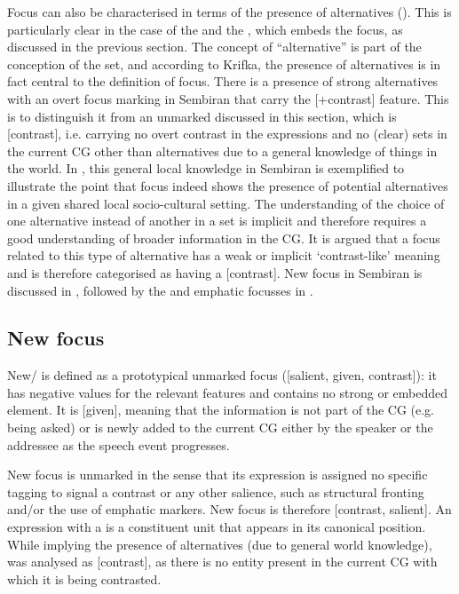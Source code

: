 \documentclass[output=paper
,modfonts
,nonflat]{langsci/langscibook}
\begin{document}
Focus can also be characterised in terms of the presence of alternatives (\citealt{Krifka2008,Krifka2012}). This is particularly clear in the case of the  and the , which embeds the focus, as discussed in the previous section. The concept of “alternative” is part of the conception of the set, and according to Krifka, the presence of alternatives is in fact central to the definition of focus. There is a presence of strong alternatives with an overt focus marking in Sembiran  that carry the [+contrast] feature. This is to distinguish it from an unmarked  discussed in this section, which is [\textminus contrast], i.e. carrying no overt contrast in the expressions and no (clear)  sets in the current CG other than alternatives due to a general knowledge of things in the world. In , this general local knowledge in Sembiran  is exemplified to illustrate the point that focus indeed shows the presence of potential alternatives in a given shared local socio-cultural setting. The understanding of the choice of one alternative instead of another in a set is implicit and therefore requires a good understanding of broader information in the CG. It is argued that a focus related to this type of alternative has a weak or implicit ‘contrast-like’ meaning and is therefore categorised as having a [\textminus contrast]. New focus in Sembiran  is discussed in , followed by the  and emphatic focusses in . 

\subsection{\label{arka:s4.1}New focus}

New/ is defined as a prototypical unmarked focus ([\textminus salient, \textminus given, \textminus contrast]): it has negative values for the relevant features and contains no strong or embedded  element. It is [\textminus given], meaning that the information is not part of the CG (e.g. being asked) or is newly added to the current CG either by the speaker or the addressee as the speech event progresses. 

New focus is unmarked in the sense that its expression is assigned no specific tagging to signal a contrast or any other salience, such as structural fronting and/or the use of emphatic markers. New focus is therefore [\textminus contrast, \textminus salient]. An expression with a  is a constituent unit that appears in its canonical position. While implying the presence of alternatives (due to general world knowledge),  was analysed as [\textminus contrast], as there is no entity present in the current CG with which it is being contrasted. 
\end{document}

